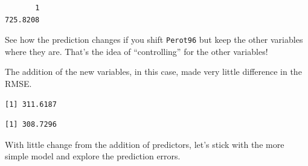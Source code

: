 \documentclass[
  letterpaper,
  DIV=11,
  numbers=noendperiod]{scrreprt}
\newenvironment{Shaded}{\begin{snugshade}}{\end{snugshade}}
\newcommand{\AttributeTok}[1]{\textcolor[rgb]{0.40,0.45,0.13}{#1}}
\newcommand{\CommentTok}[1]{\textcolor[rgb]{0.37,0.37,0.37}{#1}}
\newcommand{\DecValTok}[1]{\textcolor[rgb]{0.68,0.00,0.00}{#1}}
\newcommand{\FunctionTok}[1]{\textcolor[rgb]{0.28,0.35,0.67}{#1}}
\newcommand{\NormalTok}[1]{\textcolor[rgb]{0.00,0.23,0.31}{#1}}
\newcommand{\SpecialCharTok}[1]{\textcolor[rgb]{0.37,0.37,0.37}{#1}}
\newcommand{\StringTok}[1]{\textcolor[rgb]{0.13,0.47,0.30}{#1}}
\begin{document}
\begin{verbatim}
       1 
725.8208 
\end{verbatim}

See how the prediction changes if you shift \texttt{Perot96} but keep
the other variables where they are. That's the idea of ``controlling''
for the other variables!

The addition of the new variables, in this case, made very little
difference in the RMSE.

\begin{Shaded}
\end{Shaded}

\begin{verbatim}
[1] 311.6187
\end{verbatim}

\begin{Shaded}
\end{Shaded}

\begin{verbatim}
[1] 308.7296
\end{verbatim}

With little change from the addition of predictors, let's stick with the
more simple model and explore the prediction errors.

\begin{Shaded}
\end{Shaded}
\end{document}
